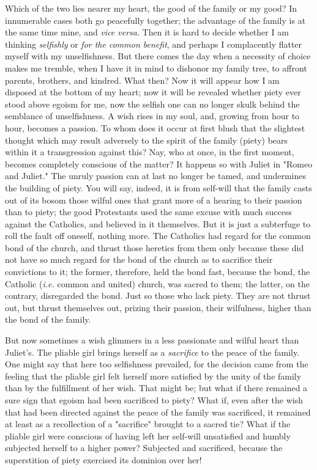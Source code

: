 Which of the two lies nearer my heart, the good of the family or my good? In 
innumerable cases both go peacefully together; the advantage of the family is 
at the same time mine, and \textit{vice versa}. Then it is hard to decide 
whether I am thinking \textit{selfishly} or \textit{for the common benefit}, 
and perhaps I complacently flatter myself with my unselfishness. But there 
comes the day when a necessity of choice makes me tremble, when I have it in 
mind to dishonor my family tree, to affront parents, brothers, and kindred. 
What then? Now it will appear how I am disposed at the bottom of my heart; now 
it will be revealed whether piety ever stood above egoism for me, now the 
selfish one can no longer skulk behind the semblance of unselfishness. A wish 
rises in my soul, and, growing from hour to hour, becomes a passion. To whom 
does it occur at first blush that the slightest thought which may result 
adversely to the spirit of the family (piety) bears within it a transgression 
against this? Nay, who at once, in the first moment, becomes completely 
conscious of the matter? It happens so with Juliet in "{}Romeo and Juliet."{} 
The unruly passion can at last no longer be tamed, and undermines the building 
of piety. You will say, indeed, it is from self-will that the family casts out 
of its bosom those wilful ones that grant more of a hearing to their passion 
than to piety; the good Protestants used the same excuse with much success 
against the Catholics, and believed in it themselves. But it is just a 
subterfuge to roll the fault off oneself, nothing more. The Catholics had 
regard for the common bond of the church, and thrust those heretics from them 
only because these did not have so much regard for the bond of the church as 
to sacrifice their convictions to it; the former, therefore, held the bond 
fast, because the bond, the Catholic (\textit{i.e.} common and united) church, 
was sacred to them; the latter, on the contrary, disregarded the bond. Just so 
those who lack piety. They are not thrust out, but thrust themselves out, 
prizing their passion, their wilfulness, higher than the bond of the family.

But now sometimes a wish glimmers in a less passionate and wilful heart than 
Juliet's. The pliable girl brings herself as a \textit{sacrifice} to the peace 
of the family. One might say that here too selfishness prevailed, for the 
decision came from the feeling that the pliable girl felt herself more 
satisfied by the unity of the family than by the fulfillment of her wish. That 
might be; but what if there remained a sure sign that egoism had been 
sacrificed to piety? What if, even after the wish that had been directed 
against the peace of the family was sacrificed, it remained at least as a 
recollection of a "{}sacrifice"{} brought to a sacred tie? What if the pliable 
girl were conscious of having left her self-will unsatisfied and humbly 
subjected herself to a higher power? Subjected and sacrificed, because the 
superstition of piety exercised its dominion over her!

